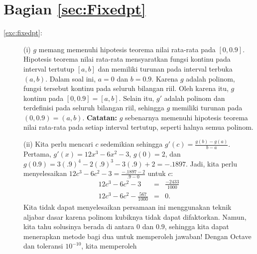 \section*{Bagian \ref{sec:Fixedpt}}
\begin{description}
\item [{\ref{exc:fixedpt}:}] (i) $g$ memang memenuhi hipotesis teorema
nilai rata-rata pada $[0,0.9]$. Hipotesis teorema nilai rata-rata
mensyaratkan fungsi kontinu pada interval tertutup $[a,b]$ dan memiliki
turunan pada interval terbuka $(a,b).$ Dalam soal ini, $a=0$ dan
$b=0.9$. Karena $g$ adalah polinom, fungsi tersebut kontinu pada
seluruh bilangan riil. Oleh karena itu, $g$ kontinu pada $[0,0.9]=[a,b]$.
Selain itu, $g'$ adalah polinom dan terdefinisi pada seluruh bilangan
riil, sehingga $g$ memiliki turunan pada $(0,0.9)=(a,b)$. \textbf{Catatan:}
$g$ sebenarnya memenuhi hipotesis teorema nilai rata-rata pada setiap
interval tertutup, seperti halnya semua polinom.

(ii) Kita perlu mencari $c$ sedemikian sehingga $g'(c)=\frac{g(b)-g(a)}{b-a}$.
Pertama, $g'(x)=12x^{3}-6x^{2}-3$, $g(0)=2$, dan $g(0.9)=3(.9)^{4}-2(.9)^{3}-3(.9)+2=-.1897$.
Jadi, kita perlu menyelesaikan $12c^{3}-6c^{2}-3=\frac{-.1897-2}{.9-0}$
untuk $c$:
\begin{eqnarray*}
12c^{3}-6c^{2}-3 & = & \frac{-2433}{1000}\\
12c^{3}-6c^{2}-\frac{567}{1000} & = & 0.
\end{eqnarray*}
Kita tidak dapat menyelesaikan persamaan ini menggunakan teknik aljabar
dasar karena polinom kubiknya tidak dapat difaktorkan. Namun, kita
tahu solusinya berada di antara $0$ dan $0.9$, sehingga kita dapat
menerapkan metode bagi dua untuk memperoleh jawaban! Dengan Octave
dan toleransi $10^{-10}$, kita memperoleh


\end{description}
